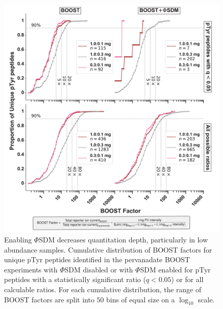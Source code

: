 \documentclass[journal=jprobs,manuscript=article]{achemso}
\begin{document}
\begin{figure}[t!]
\centering
\includegraphics[width=165mm]{figures/supplements/boost_factor_cdfs.pdf}
\caption{Enabling $\Phi$SDM decreases quantitation depth, particularly in low abundance samples. Cumulative distribution of BOOST factors for unique pTyr peptides identified in the pervanadate BOOST experiments with $\Phi$SDM disabled or with $\Phi$SDM enabled for pTyr peptides with a statistically significant ratio ($q<0.05$) or for all calculable ratios. For each cumulative distribution, the range of BOOST factors are split into $50$ bins of equal size on a $\log_{10}$ scale. }\label{boost_factor_cdfs}
\end{figure}
\end{document}
